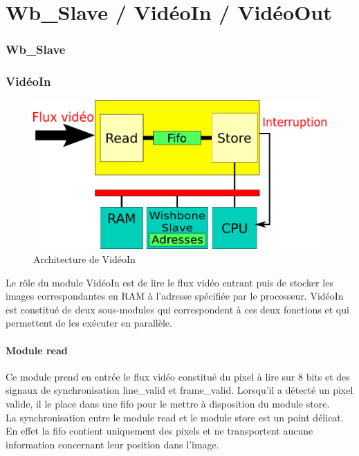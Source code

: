 \documentclass[a4paper,12pt]{report}
\begin{document}
{{    \part{Wb\_Slave / VidéoIn / VidéoOut}
    \section{Wb\_Slave}


    \section{VidéoIn}

\begin{figure}[!h]
	\centering
	\includegraphics[scale = 0.5]{video_in.png}
	\caption{Architecture de VidéoIn}
\end{figure}

Le rôle du module VidéoIn est de lire le flux vidéo entrant puis de stocker les images correspondantes en RAM à l'adresse spécifiée par le processeur.
VidéoIn est constitué de deux sous-modules qui correspondent à ces deux fonctions et qui permettent de les exécuter en parallèle.


\subsection{Module read}
Ce module prend en entrée le flux vidéo constitué du pixel à lire sur 8 bits et des signaux de synchronisation line\_valid et frame\_valid.
Lorsqu'il a détecté un pixel valide, il le place dans une fifo pour le mettre à disposition du module store.\\
La synchronisation entre le module read et le module store est un point délicat.
En effet la fifo contient uniquement des pixels et ne transportent aucune information concernant leur position dans l'image.

}}
\end{document}
